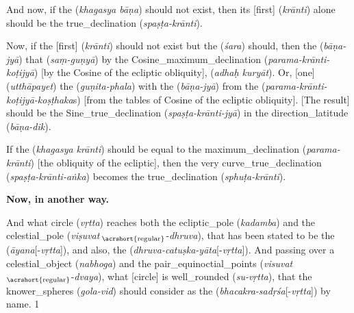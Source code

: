 And now, if the  (\textit{khagasya bāṇa}) should not exist, then its [first]  (\textit{krānti}) alone should be the \gls{true_declination} (\textit{spaṣṭa-krānti}). 

Now, if the [first]  (\textit{krānti}) should not exist but the  (\textit{śara}) should, then the  (\textit{bāṇa-jyā}) that
 (\textit{saṃ-guṇyā}) by the \gls{Cosine_maximum_declination} (\textit{parama-krānti-koṭijyā}) [\ie by the Cosine of the ecliptic obliquity],  (\textit{adhaḥ kuryāt}). Or, [one]  (\textit{utthāpayet}) the  (\textit{guṇita-phala}) with the  (\textit{bāṇa-jyā}) from the  (\textit{parama-krānti-koṭijyā-koṣṭhaka}s) [\ie from the tables of Cosine of the ecliptic obliquity]. [The result] should be the \gls{Sine_true_declination} (\textit{spaṣṭa-krānti-jyā}) in the \gls{direction_latitude} (\textit{bāṇa-dik}). 

If the  (\textit{khagasya krānti}) should be equal to the \gls{maximum_declination} (\textit{parama-krānti}) [\ie the obliquity of the ecliptic], then the very \gls{curve_true_declination} (\textit{spa\-ṣṭa-krānti-aṅka}) becomes the \gls{true_declination} (\textit{sphuṭa-krānti}). %
\medskip

\textbf{Now, in another way.}
\medskip

And what \gls{circle} (\textit{vṛtta}) reaches both the \gls{ecliptic_pole} (\textit{kadamba}) and the \gls{celestial_pole} (\textit{viṣuvat}\,$_\text{\acrshort{regular}}$-\textit{dhruva}), that has been stated to be the  (\textit{āyana}[-\textit{vṛtta}]), and also, the  (\textit{dhruva-catuṣka-yāta}[-\textit{vṛtta}]). And passing over a \gls{celestial_object} (\textit{nabhoga}) and the \gls{pair_equinoctial_points} (\textit{visuvat}\,$_\text{\acrshort{regular}}$-\textit{dvaya}), what [circle] is \gls{well_rounded} (\textit{su-vṛtta}), that the \gls{knower_spheres} (\textit{gola-vid}) should consider as
the  (\textit{bhacakra-sadṛśa}[-\textit{vṛtta}]) by name. 1  


